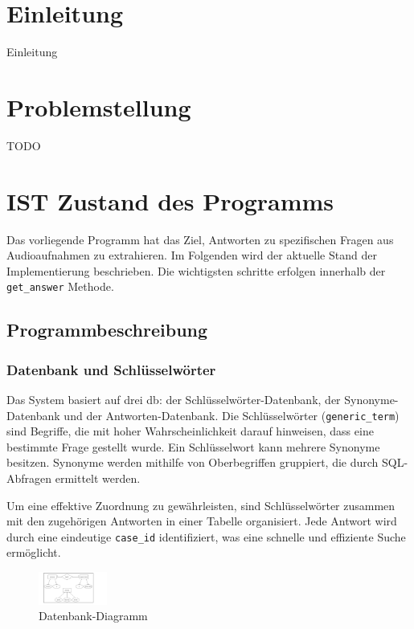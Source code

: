 \section{Einleitung}
Einleitung

\section{Problemstellung}
TODO
\section{IST Zustand des Programms}
Das vorliegende Programm hat das Ziel, Antworten zu spezifischen Fragen aus Audioaufnahmen zu extrahieren. Im Folgenden wird der aktuelle Stand der Implementierung beschrieben. Die wichtigsten schritte erfolgen innerhalb der \texttt{get\_answer} Methode.
\subsection{Programmbeschreibung}
\subsubsection{Datenbank und Schlüsselwörter}
Das System basiert auf drei \ac{db}: der Schlüsselwörter-Datenbank, der Synonyme-Datenbank und der Antworten-Datenbank. Die Schlüsselwörter (\texttt{generic\_term}) sind Begriffe, die mit hoher Wahrscheinlichkeit darauf hinweisen, dass eine bestimmte Frage gestellt wurde. Ein Schlüsselwort kann mehrere Synonyme besitzen. Synonyme werden mithilfe von Oberbegriffen gruppiert, die durch SQL-Abfragen ermittelt werden.

Um eine effektive Zuordnung zu gewährleisten, sind Schlüsselwörter zusammen mit den zugehörigen Antworten in einer Tabelle organisiert. Jede Antwort wird durch eine eindeutige \texttt{case\_id} identifiziert, was eine schnelle und effiziente Suche ermöglicht.

\begin{figure}[h]
    \centering
    \includegraphics[width=0.2\textwidth]{../images/db-diagram.png}
    \caption{Datenbank-Diagramm}
    \label{fig:SVD}
\end{figure}

